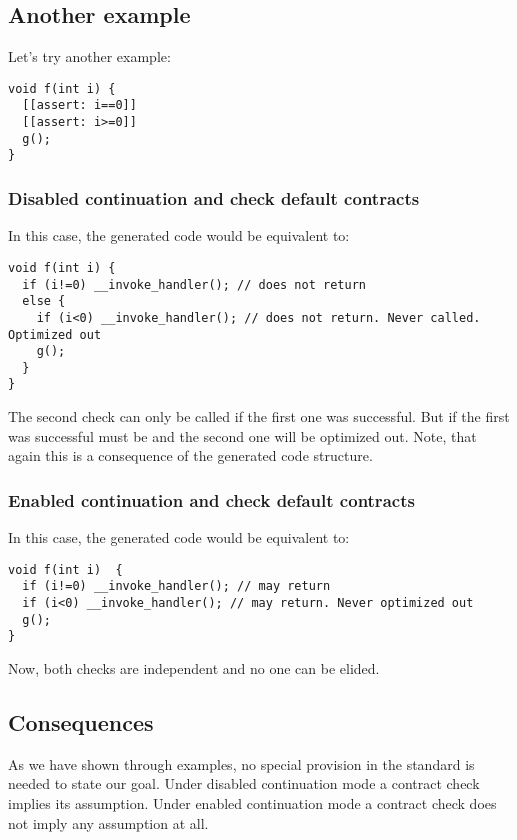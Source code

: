 \subsection{Another example}

Let's try another example:

\begin{lstlisting}
void f(int i) {
  [[assert: i==0]]
  [[assert: i>=0]]
  g();
}
\end{lstlisting}

\subsubsection{Disabled continuation and check default contracts}

In this case, the generated code would be equivalent to:

\begin{lstlisting}
void f(int i) {
  if (i!=0) __invoke_handler(); // does not return
  else {
    if (i<0) __invoke_handler(); // does not return. Never called. Optimized out
    g();
  }
}
\end{lstlisting}

The second check can only be called if the first one was successful.
But if the first was successful  must be  and the second
one will be optimized out. Note, that again this is a consequence of the 
generated code structure.

\subsubsection{Enabled continuation and check default contracts}

In this case, the generated code would be equivalent to:

\begin{lstlisting}
void f(int i)  {
  if (i!=0) __invoke_handler(); // may return
  if (i<0) __invoke_handler(); // may return. Never optimized out
  g();
}
\end{lstlisting}

Now, both checks are independent and no one can be elided.

\subsection{Consequences}

As we have shown through examples, no special provision in the standard is
needed to state our goal. Under disabled continuation mode a contract check implies
its assumption. Under enabled continuation mode a contract check does not imply
any assumption at all.
